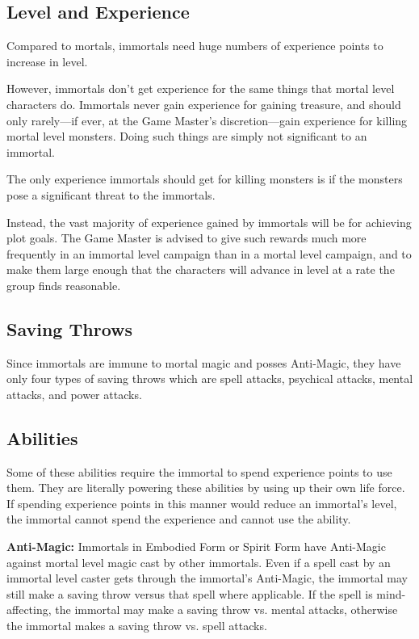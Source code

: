 \begin{multicols*}{2}
\subsection{Level and Experience}
Compared to mortals, immortals need huge numbers of experience points to increase in level.

However, immortals don’t get experience for the same things that mortal level characters do. Immortals never gain experience for gaining treasure, and should only rarely—if ever, at the Game Master’s discretion—gain experience for killing mortal level monsters. Doing such things are simply not significant to an immortal.

The only experience immortals should get for killing monsters is if the monsters pose a significant threat to the immortals. 

Instead, the vast majority of experience gained by immortals will be for achieving plot goals. The Game Master is advised to give such rewards much more frequently in an immortal level campaign than in a mortal level campaign, and to make them large enough that the characters will advance in level at a rate the group finds reasonable.

\subsection{Saving Throws}
Since immortals are immune to mortal magic and posses Anti-Magic, they have only four types of saving throws which are spell attacks, psychical attacks, mental attacks, and power attacks.

\subsection{Abilities}
Some of these abilities require the immortal to spend experience points to use them. They are literally powering these abilities by using up their own life force. If spending experience points in this manner would reduce an immortal’s level, the immortal cannot spend the experience and cannot use the ability.

\textbf{Anti-Magic:} Immortals in Embodied Form or Spirit Form have Anti-Magic against mortal level magic cast by other immortals. Even if a spell cast by an immortal level caster gets through the immortal’s Anti-Magic, the immortal may still make a saving throw versus that spell where applicable. If the spell is mind-affecting, the immortal may make a saving throw vs. mental attacks, otherwise the immortal makes a saving throw vs. spell attacks.


\end{multicols*}
